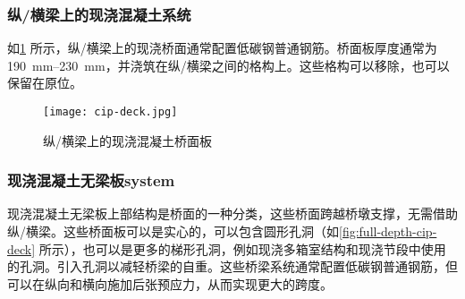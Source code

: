 \subsubsection{纵/横梁上的现浇混凝土系统}

如\cref{fig:cip-deck} 所示，纵/横梁上的现浇桥面通常配置低碳钢普通钢筋。桥面板厚度通常为 \qtyrange{190}{230}{mm}，并浇筑在纵/横梁之间的格构上。这些格构可以移除，也可以保留在原位。

\begin{figure}
  \texttt{[image: cip-deck.jpg]}
  \caption{纵/横梁上的现浇混凝土桥面板}
  \label{fig:cip-deck}
\end{figure}


\subsubsection{现浇混凝土无梁板\gls*{system}}
\label{subsubsec:full-depth-cast-in-place-concrete-system}
现浇混凝土无梁板上部结构是桥面的一种分类，这些桥面跨越桥墩支撑，无需借助纵/横梁。这些桥面板可以是实心的，可以包含圆形孔洞（如\cref{fig:full-depth-cip-deck} 所示），也可以是更多的梯形孔洞，例如现浇多箱室结构和现浇节段中使用的孔洞。引入孔洞以减轻桥梁的自重。这些桥梁系统通常配置低碳钢普通钢筋，但可以在纵向和横向施加后张预应力，从而实现更大的跨度。

